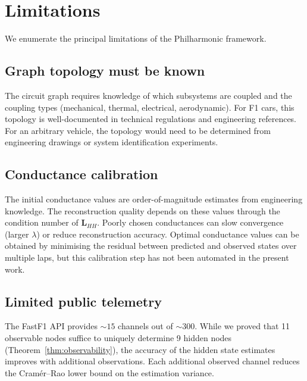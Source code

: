 \documentclass[twocolumn,10pt,a4paper]{article}
\theoremstyle{definition}
\theoremstyle{remark}
\newcommand{\mat}[1]{\mathbf{#1}}
\begin{document}
\section{Limitations}\label{sec:limitations}

We enumerate the principal limitations of the Philharmonic framework.

\subsection{Graph topology must be known}

The circuit graph requires knowledge of which subsystems are coupled and the coupling types (mechanical, thermal, electrical, aerodynamic). For F1 cars, this topology is well-documented in technical regulations \citep{FIA2023} and engineering references. For an arbitrary vehicle, the topology would need to be determined from engineering drawings or system identification experiments.

\subsection{Conductance calibration}

The initial conductance values are order-of-magnitude estimates from engineering knowledge. The reconstruction quality depends on these values through the condition number of $\mat{L}_{HH}$. Poorly chosen conductances can slow convergence (larger $\lambda$) or reduce reconstruction accuracy. Optimal conductance values can be obtained by minimising the residual between predicted and observed states over multiple laps, but this calibration step has not been automated in the present work.

\subsection{Limited public telemetry}

The FastF1 API provides $\sim 15$ channels out of $\sim 300$. While we proved that 11 observable nodes suffice to uniquely determine 9 hidden nodes (Theorem~\ref{thm:observability}), the accuracy of the hidden state estimates improves with additional observations. Each additional observed channel reduces the Cram\'{e}r--Rao lower bound on the estimation variance.
\end{document}
